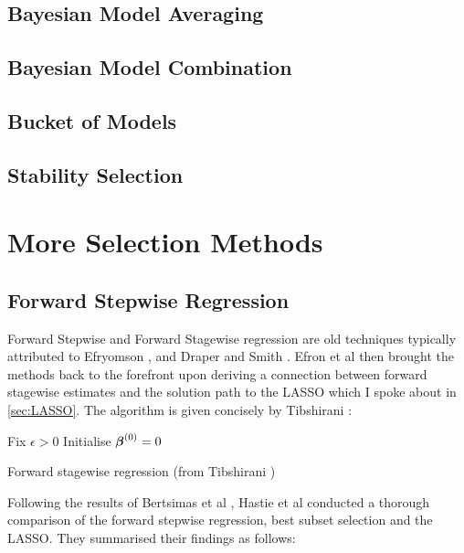 \subsection{Bayesian Model Averaging}
\subsection{Bayesian Model Combination}
\subsection{Bucket of Models}
\subsection{Stability Selection}

\section{More Selection Methods}
\subsection{Forward Stepwise Regression}

Forward Stepwise and Forward Stagewise regression are old techniques typically attributed to Efryomson , and Draper and Smith . Efron et al  then brought the methods back to the forefront upon deriving a connection between forward stagewise estimates and the solution path to the LASSO which I spoke about in \cref{sec:LASSO}. The algorithm is given concisely by Tibshirani :

\begin{algorithm}[H]
    Fix $\epsilon>0$\;
    Initialise $\boldsymbol{\beta}^{(0)}=0$\;
    \caption{Forward stagewise regression (from Tibshirani )}\label{alg:forward-stagewise-regression}
\end{algorithm}

Following the results of Bertsimas et al , Hastie et al  conducted a thorough comparison of the forward stepwise regression, best subset selection and the LASSO. They summarised their findings as follows:

